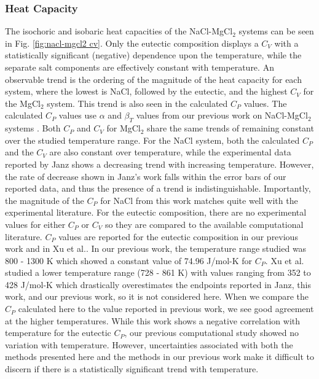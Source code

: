 \documentclass[review]{elsarticle}
\begin{document}
\subsubsection{Heat Capacity}
The isochoric and isobaric heat capacities of the NaCl-MgCl$_2$ systems can be seen in Fig. \ref{fig:nacl-mgcl2 cv}. Only the eutectic composition displays a $C_V$ with a statistically significant (negative) dependence upon the temperature, while the separate salt components are effectively constant with temperature. An observable trend is the ordering of the magnitude of the heat capacity for each system, where the lowest is NaCl, followed by the eutectic, and the highest $C_V$ for the MgCl$_2$ system. This trend is also seen in the calculated $C_P$ values. The calculated $C_P$ values use \textit{$\alpha$} and \textit{$\beta_T$} values from our previous work on NaCl-MgCl$_2$ systems \cite{duemmler_naclmgcl}. Both $C_P$ and $C_V$ for MgCl$_2$ share the same trends of remaining constant over the studied temperature range. For the NaCl system, both the calculated $C_P$ and the $C_V$ are also constant over temperature, while the experimental data reported by Janz shows a decreasing trend with increasing temperature. However, the rate of decrease shown in Janz's work falls within the error bars of our reported data, and thus the presence of a trend is indistinguishable. Importantly, the magnitude of the $C_P$ for NaCl from this work matches quite well with the experimental literature. For the eutectic composition, there are no experimental values for either $C_P$ or $C_V$ so they are compared to the available computational literature. $C_P$ values are reported for the eutectic composition in our previous work \cite{duemmler_naclmgcl} and in Xu et al.\cite{xu2020powerful}. In our previous work, the temperature range studied was 800 - 1300 K which showed a constant value of 74.96 J/mol-K for $C_P$. Xu et al. studied a lower temperature range (728 - 861 K) with values ranging from 352 to 428 J/mol-K which drastically overestimates the endpoints reported in Janz, this work, and our previous work, so it is not considered here. When we compare the $C_P$ calculated here to the value reported in previous work, we see good agreement at the higher temperatures. While this work shows a negative correlation with temperature for the eutectic $C_P$, our previous computational study showed no variation with temperature. However, uncertainties associated with both the methods presented here and the methods in our previous work make it difficult to discern if there is a statistically significant trend with temperature.
\end{document}
